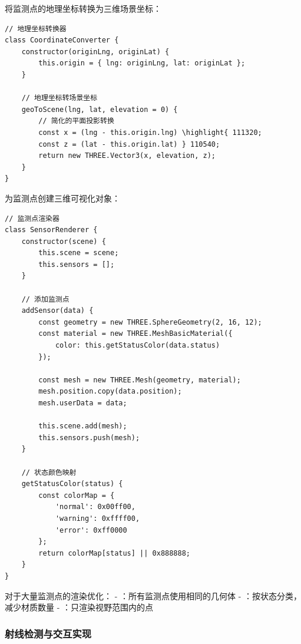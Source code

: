
将监测点的地理坐标转换为三维场景坐标：

\begin{lstlisting}[style=javascript]
// 地理坐标转换器
class CoordinateConverter {
    constructor(originLng, originLat) {
        this.origin = { lng: originLng, lat: originLat };
    }
    
    // 地理坐标转场景坐标
    geoToScene(lng, lat, elevation = 0) {
        // 简化的平面投影转换
        const x = (lng - this.origin.lng) \highlight{ 111320;
        const z = (lat - this.origin.lat) } 110540;
        return new THREE.Vector3(x, elevation, z);
    }
}
\end{lstlisting}


为监测点创建三维可视化对象：

\begin{lstlisting}[style=javascript]
// 监测点渲染器
class SensorRenderer {
    constructor(scene) {
        this.scene = scene;
        this.sensors = [];
    }
    
    // 添加监测点
    addSensor(data) {
        const geometry = new THREE.SphereGeometry(2, 16, 12);
        const material = new THREE.MeshBasicMaterial({
            color: this.getStatusColor(data.status)
        });
        
        const mesh = new THREE.Mesh(geometry, material);
        mesh.position.copy(data.position);
        mesh.userData = data;
        
        this.scene.add(mesh);
        this.sensors.push(mesh);
    }
    
    // 状态颜色映射
    getStatusColor(status) {
        const colorMap = {
            'normal': 0x00ff00,
            'warning': 0xffff00, 
            'error': 0xff0000
        };
        return colorMap[status] || 0x888888;
    }
}
\end{lstlisting}


对于大量监测点的渲染优化： - ：所有监测点使用相同的几何体 - ：按状态分类，减少材质数量 - ：只渲染视野范围内的点

\hypertarget{ux5c04ux7ebfux68c0ux6d4bux4e0eux4ea4ux4e92ux5b9eux73b0}{%
\subsubsection{射线检测与交互实现}\label{ux5c04ux7ebfux68c0ux6d4bux4e0eux4ea4ux4e92ux5b9eux73b0}}

